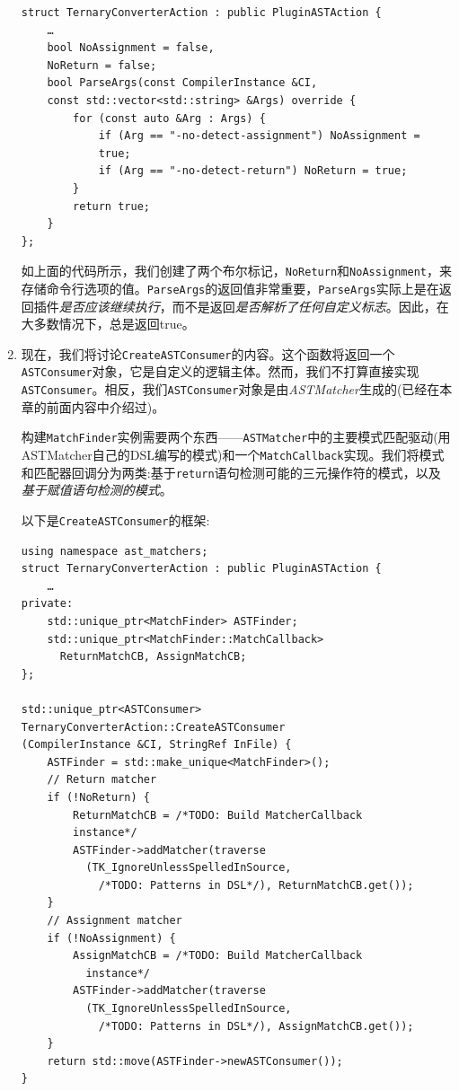 \begin{enumerate}
\begin{lstlisting}[style=styleCXX]
struct TernaryConverterAction : public PluginASTAction {
	…
	bool NoAssignment = false,
	NoReturn = false;
	bool ParseArgs(const CompilerInstance &CI,
	const std::vector<std::string> &Args) override {
		for (const auto &Arg : Args) {
			if (Arg == "-no-detect-assignment") NoAssignment =
			true;
			if (Arg == "-no-detect-return") NoReturn = true;
		}
	    return true;
    }
};
\end{lstlisting}

如上面的代码所示，我们创建了两个布尔标记，\texttt{NoReturn}和\texttt{NoAssignment}，来存储命令行选项的值。\texttt{ParseArgs}的返回值非常重要，\texttt{ParseArgs}实际上是在返回插件\textit{是否应该继续执行}，而不是返回\textit{是否解析了任何自定义标志}。因此，在大多数情况下，总是返回true。

\item 现在，我们将讨论\texttt{CreateASTConsumer}的内容。这个函数将返回一个\texttt{ASTConsumer}对象，它是自定义的逻辑主体。然而，我们不打算直接实现\texttt{ASTConsumer}。相反，我们\texttt{ASTConsumer}对象是由\textit{ASTMatcher}生成的(已经在本章的前面内容中介绍过)。

构建\texttt{MatchFinder}实例需要两个东西——\texttt{ASTMatcher}中的主要模式匹配驱动(用ASTMatcher自己的DSL编写的模式)和一个\texttt{MatchCallback}实现。我们将模式和匹配器回调分为两类:基于\texttt{return}语句检测可能的三元操作符的模式，以及\textit{基于赋值语句检测的模式}。

以下是\texttt{CreateASTConsumer}的框架:

\begin{lstlisting}[style=styleCXX]
using namespace ast_matchers;
struct TernaryConverterAction : public PluginASTAction {
	…
private:
	std::unique_ptr<MatchFinder> ASTFinder;
	std::unique_ptr<MatchFinder::MatchCallback>
	  ReturnMatchCB, AssignMatchCB;
};

std::unique_ptr<ASTConsumer>
TernaryConverterAction::CreateASTConsumer
(CompilerInstance &CI, StringRef InFile) {
	ASTFinder = std::make_unique<MatchFinder>();
	// Return matcher
	if (!NoReturn) {
		ReturnMatchCB = /*TODO: Build MatcherCallback
		instance*/
		ASTFinder->addMatcher(traverse
		  (TK_IgnoreUnlessSpelledInSource,
		    /*TODO: Patterns in DSL*/), ReturnMatchCB.get());
	}
	// Assignment matcher
	if (!NoAssignment) {
		AssignMatchCB = /*TODO: Build MatcherCallback
		  instance*/
		ASTFinder->addMatcher(traverse
		  (TK_IgnoreUnlessSpelledInSource,
		    /*TODO: Patterns in DSL*/), AssignMatchCB.get());
	}
	return std::move(ASTFinder->newASTConsumer());
}
\end{lstlisting}


\end{enumerate}
